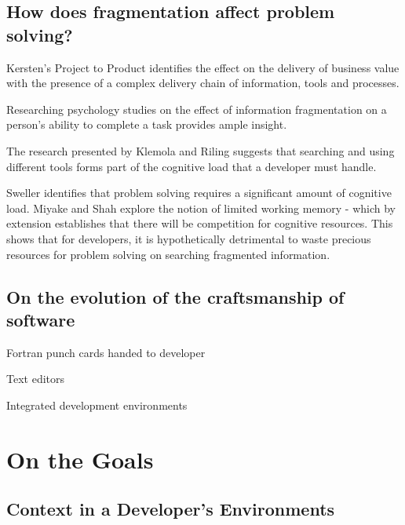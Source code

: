 
\subsection{How does fragmentation affect problem solving?}


Kersten's Project to Product \parencite*{kersten2018projecproduct} identifies the effect on the delivery of business value with the presence of a complex delivery chain of information, tools and processes.


Researching psychology studies on the effect of information fragmentation on a person's ability to complete a task provides ample insight. 

The research presented by Klemola and Riling \parencite*{klemola2002modeling} suggests that searching and using different tools forms part of the cognitive load that a developer must handle.

Sweller \parencite*{sweller1998cognitive} identifies that problem solving requires a significant amount of cognitive load. Miyake and Shah \parencite*{miyake1999models} explore the notion of limited working memory - which by extension establishes that there will be competition for cognitive resources. This shows that for developers, it is hypothetically detrimental to waste precious resources for problem solving on searching fragmented information.

\subsection{On the evolution of the craftsmanship of software}

Fortran punch cards handed to developer

Text editors

Integrated development environments 


\section{On the Goals}

\subsection{Context in a Developer's Environments}

